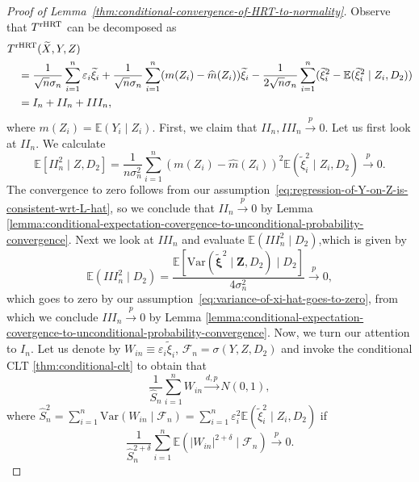 \documentclass[12pt]{article}
\theoremstyle{definition}
\theoremstyle{remark}
\newcommand{\E}{\mathbb E}								%
\newcommand{\srx}{X}									%
\newcommand{\srz}{Z}									%
\newcommand{\sry}{Y}									%
\begin{document}
\begin{proof}[Proof of Lemma~\ref{thm:conditional-convergence-of-HRT-to-normality}]
	Observe that $T^{\textnormal{rHRT}}$ can be decomposed as
	\begin{equation}\label{eq:rHRT-decomposition}
	\begin{split}
		&T^{\textnormal{rHRT}}(\widetilde \srx,\sry,\srz) \\
		&\quad= \frac{1}{\sqrt n \sigma_n} \sum_{i=1}^n \varepsilon_i\widetilde \xi_i + \frac{1}{\sqrt n \sigma_n} \sum_{i=1}^n (m(\srz_i) - \widehat m(\srz_i))\widetilde\xi_i  - \frac{1}{2\sqrt n \sigma_n}\sum_{i=1}^n (\widetilde\xi^2_i - \E(\widetilde \xi_i^2 \mid \srz_i, D_2)) \\
		&\quad= I_n + II_n + III_n,
	\end{split}
	\end{equation}
	where $m(\srz_i) = \E(\sry_i \mid \srz_i)$. First, we claim that $II_n,III_n \overset{p}{\to} 0$. Let us first look at $II_n$. We calculate
	$$
	\E[II_n^2 \mid \srz, D_2] = \frac{1}{n \sigma^2_n} \sum_{i=1}^n(m(\srz_i) - \widehat m(\srz_i))^2 \E(\widetilde \xi_i^2 \mid \srz_i,D_2)  \overset{p}{\to} 0.
	$$
	The convergence to zero follows from our assumption~\eqref{eq:regression-of-Y-on-Z-is-consistent-wrt-L-hat}, so we conclude that $II_n \overset{p}{\to} 0$ by Lemma \ref{lemma:conditional-expectation-covergence-to-unconditional-probability-convergence}. Next we look at $III_n$ and evaluate $\E( III_n^2 \mid D_2)$,which is given by
	$$
	\E (III_n^2 \mid D_2) = \frac{\E\left[\mathrm{Var}(\widetilde{\bm \xi}^2 \mid \bm \srz, D_2)\mid D_2\right]}{4\sigma_n^2} \overset{p}{\to} 0,
	$$ 
	which goes to zero by our assumption~\eqref{eq:variance-of-xi-hat-goes-to-zero}, from which we conclude $III_n \overset{p}{\to} 0$ by Lemma \ref{lemma:conditional-expectation-covergence-to-unconditional-probability-convergence}. Now, we turn our attention to $I_n$. Let us denote by $W_{in} \equiv \varepsilon_i\widetilde\xi_i$, $\mathcal{F}_n = \sigma(\sry,\srz,D_2)$ and invoke the conditional CLT \ref{thm:conditional-clt} to obtain that
	\begin{equation}\label{eq:conditional-clt-for-product-of-residual}
		\frac{1}{\widehat S_n} \sum_{i=1}^n W_{in} \overset{d,p}{\to} N(0,1),
	\end{equation}
	where $\widehat S^2_n = \sum_{i=1}^n\mathrm{Var}(W_{in} \mid \mathcal{F}_n) = \sum_{i=1}^n \varepsilon_i^2 \E ( \widetilde\xi_i^2 \mid \srz_i,D_2) $  if
	\begin{equation}\label{eq:clt-moment-condition}
		\frac{1}{\widehat S_n^{2+\delta}} \sum_{i=1}^n \E(|W_{in}|^{2+\delta} \mid \mathcal{F}_n) \overset{p}{\to} 0.

\end{equation}
\end{proof}
\end{document}
